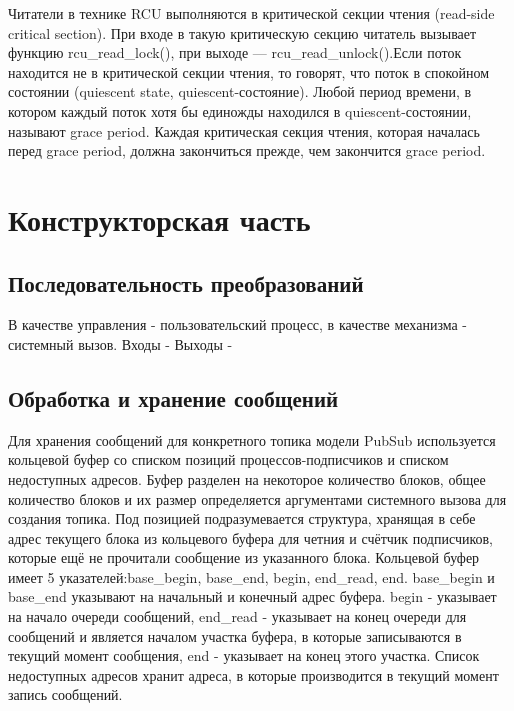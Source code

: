 \documentclass{bmstu}
\begin{document}
Читатели в технике RCU выполняются в критической секции чтения (read-side critical section). При входе в такую критическую секцию читатель вызывает функцию rcu\_read\_lock(), при выходе — rcu\_read\_unlock().Если поток находится не в критической секции чтения, то говорят, что поток в спокойном состоянии (quiescent state, quiescent-состояние). Любой период времени, в котором каждый поток хотя бы единожды находился в quiescent-состоянии, называют grace period. Каждая критическая секция чтения, которая началась перед grace period, должна закончиться прежде, чем закончится grace period.


\chapter{Конструкторская часть}
\section{Последовательность преобразований}
В качестве управления - пользовательский процесс, в качестве механизма - системный вызов.
Входы - %
Выходы - %
\section{Обработка и хранение сообщений}
Для хранения сообщений для конкретного топика модели PubSub используется кольцевой буфер со списком позиций процессов-подписчиков и списком недоступных адресов. Буфер разделен на некоторое количество блоков, общее количество блоков и их размер определяется аргументами системного вызова для создания топика. Под позицией подразумевается структура, хранящая в себе адрес текущего блока из кольцевого буфера для четния и счётчик подписчиков, которые ещё не прочитали сообщение из указанного блока.
Кольцевой буфер имеет 5 указателей:base\_begin, base\_end, begin, end\_read, end. base\_begin и base\_end указывают на начальный и конечный адрес буфера. begin - указывает на начало очереди сообщений, end\_read - указывает на конец очереди для сообщений и является началом участка буфера, в которые записываются в текущий момент сообщения, end - указывает на конец этого участка. Список недоступных адресов хранит адреса, в которые производится в текущий момент запись сообщений. 
\end{document}
